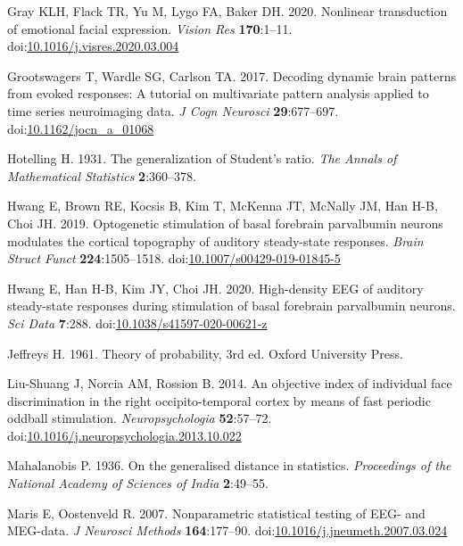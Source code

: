 \documentclass[]{article}
\begin{document}
\leavevmode\hypertarget{ref-Gray2020}{}%
Gray KLH, Flack TR, Yu M, Lygo FA, Baker DH. 2020. Nonlinear transduction of emotional facial expression. \emph{Vision Res} \textbf{170}:1--11. doi:\href{https://doi.org/10.1016/j.visres.2020.03.004}{10.1016/j.visres.2020.03.004}

\leavevmode\hypertarget{ref-Grootswagers2017}{}%
Grootswagers T, Wardle SG, Carlson TA. 2017. Decoding dynamic brain patterns from evoked responses: A tutorial on multivariate pattern analysis applied to time series neuroimaging data. \emph{J Cogn Neurosci} \textbf{29}:677--697. doi:\href{https://doi.org/10.1162/jocn_a_01068}{10.1162/jocn\_a\_01068}

\leavevmode\hypertarget{ref-Hotelling1931}{}%
Hotelling H. 1931. The generalization of Student's ratio. \emph{The Annals of Mathematical Statistics} \textbf{2}:360--378.

\leavevmode\hypertarget{ref-Hwang2019}{}%
Hwang E, Brown RE, Kocsis B, Kim T, McKenna JT, McNally JM, Han H-B, Choi JH. 2019. Optogenetic stimulation of basal forebrain parvalbumin neurons modulates the cortical topography of auditory steady-state responses. \emph{Brain Struct Funct} \textbf{224}:1505--1518. doi:\href{https://doi.org/10.1007/s00429-019-01845-5}{10.1007/s00429-019-01845-5}

\leavevmode\hypertarget{ref-Hwang2020}{}%
Hwang E, Han H-B, Kim JY, Choi JH. 2020. High-density EEG of auditory steady-state responses during stimulation of basal forebrain parvalbumin neurons. \emph{Sci Data} \textbf{7}:288. doi:\href{https://doi.org/10.1038/s41597-020-00621-z}{10.1038/s41597-020-00621-z}

\leavevmode\hypertarget{ref-Jeffreys1961}{}%
Jeffreys H. 1961. Theory of probability, 3rd ed. Oxford University Press.

\leavevmode\hypertarget{ref-Liu-Shuang2014}{}%
Liu-Shuang J, Norcia AM, Rossion B. 2014. An objective index of individual face discrimination in the right occipito-temporal cortex by means of fast periodic oddball stimulation. \emph{Neuropsychologia} \textbf{52}:57--72. doi:\href{https://doi.org/10.1016/j.neuropsychologia.2013.10.022}{10.1016/j.neuropsychologia.2013.10.022}

\leavevmode\hypertarget{ref-Mahalanobis1936}{}%
Mahalanobis P. 1936. On the generalised distance in statistics. \emph{Proceedings of the National Academy of Sciences of India} \textbf{2}:49--55.

\leavevmode\hypertarget{ref-Maris2007}{}%
Maris E, Oostenveld R. 2007. Nonparametric statistical testing of EEG- and MEG-data. \emph{J Neurosci Methods} \textbf{164}:177--90. doi:\href{https://doi.org/10.1016/j.jneumeth.2007.03.024}{10.1016/j.jneumeth.2007.03.024}
\end{document}

